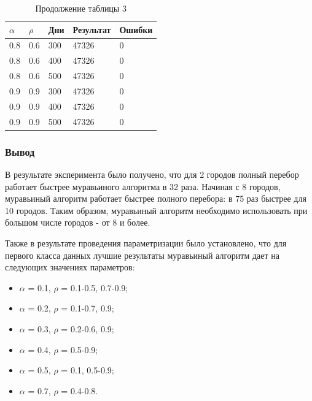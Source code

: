 \clearpage
\begin{table}[h]
	\begin{center}
		\begin{flushleft}
			\captionsetup{margin*=125pt}
			\caption*{Продолжение таблицы 3}
		\end{flushleft}
		\begin{tabular}{|l | l | l | l | l | } \hline
			$\alpha$ & $\rho$ & Дни & Результат & Ошибки \\ \hline

			\hline
			0.8 &  0.6 &  300 & 47326 &     0 \\
			0.8 &  0.6 &  400 & 47326 &     0 \\
			0.8 &  0.6 &  500 & 47326 &     0 \\
			\hline
			0.9 &  0.9 &  300 & 47326 &     0 \\
			0.9 &  0.9 &  400 & 47326 &     0 \\
			0.9 &  0.9 &  500 & 47326 &     0 \\
			\hline
		\end{tabular}
	\end{center}
\end{table}

\subsubsection*{Вывод}
В результате эксперимента было получено, что для 2 городов полный перебор работает быстрее муравьиного алгоритма в 32 раза. Начиная с 8 городов, муравьиный алгоритм работает быстрее полного перебора: в 75 раз быстрее для 10 городов. Таким образом, муравьиный алгоритм необходимо использовать при большом числе городов - от 8 и более.

Также в результате проведения параметризации было установлено, что для первого класса данных лучшие результаты муравьиный алгоритм дает на следующих значениях параметров:
\begin{itemize}[label*=---]
	\item $\alpha$ = 0.1, $\rho$ = 0.1-0.5, 0.7-0.9;
	\item $\alpha$ = 0.2, $\rho$ = 0.1-0.7, 0.9;
	\item $\alpha$ = 0.3, $\rho$ = 0.2-0.6, 0.9;
	\item $\alpha$ = 0.4, $\rho$ = 0.5-0.9;
	\item $\alpha$ = 0.5, $\rho$ = 0.1, 0.5-0.9;
	\item $\alpha$ = 0.7, $\rho$ = 0.4-0.8.
\end{itemize}

